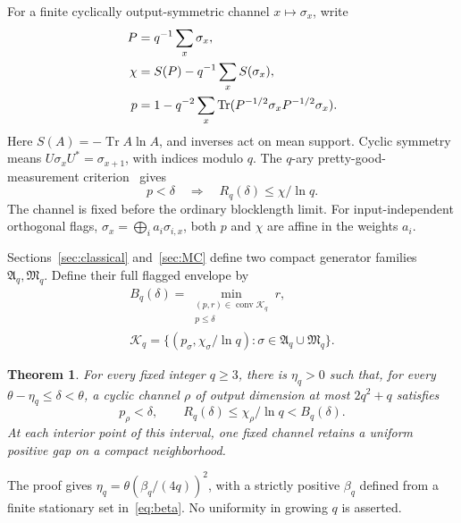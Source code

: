 \documentclass[12pt,letterpaper,onecolumn]{article}
\newtheorem{theorem}{Theorem}
\theoremstyle{definition}
\theoremstyle{remark}
\DeclareMathOperator{\Tr}{Tr}
\DeclareMathOperator{\conv}{conv}
\begin{document}
For a finite cyclically output-symmetric channel \(x\mapsto\sigma_x\), write
\begin{align}
P&=q^{-1}\sum_x\sigma_x,\notag\\
\chi&=S(P)-q^{-1}\sum_xS(\sigma_x),\notag\\
p&=1-q^{-2}\sum_x
\Tr(P^{-1/2}\sigma_xP^{-1/2}\sigma_x).\label{eq:cq}
\end{align}
Here \(S(A)=-\Tr A\ln A\), and inverses act on mean support. Cyclic symmetry means \(U\sigma_xU^*=\sigma_{x+1}\), with indices modulo \(q\). The \(q\)-ary pretty-good-measurement criterion~\cite[Prop.~27]{AG2026} gives
\begin{equation}\label{eq:criterion}
p<\delta\quad\Longrightarrow\quad R_q(\delta)\le\chi/\ln q.
\end{equation}
The channel is fixed before the ordinary blocklength limit. For input-independent orthogonal flags,
\(\sigma_x=\bigoplus_i a_i\sigma_{i,x}\), both \(p\) and \(\chi\) are affine in the weights \(a_i\).

Sections~\ref{sec:classical} and~\ref{sec:MC} define two compact generator families \(\mathfrak A_q,\mathfrak M_q\). Define their full flagged envelope by
\begin{equation}\label{eq:benchmark}
\begin{gathered}
B_q(\delta)=\min_{\substack{(p,r)\in\conv\mathcal K_q\\p\le\delta}}r,
\\
\mathcal K_q=\{(p_\sigma,\chi_\sigma/\ln q):
\sigma\in\mathfrak A_q\cup\mathfrak M_q\}.
\end{gathered}
\end{equation}

\begin{theorem}\label{thm:main}
For every fixed integer \(q\ge3\), there is \(\eta_q>0\) such that, for every
\(\theta-\eta_q\le\delta<\theta\), a cyclic channel \(\rho\) of output dimension at most \(2q^2+q\) satisfies
\begin{equation}\label{eq:strict}
p_\rho<\delta,\qquad
R_q(\delta)\le\chi_\rho/\ln q<B_q(\delta).
\end{equation}
At each interior point of this interval, one fixed channel retains a uniform positive gap on a compact neighborhood.
\end{theorem}

The proof gives \(\eta_q=\theta(\beta_q/(4q))^2\), with a strictly positive \(\beta_q\) defined from a finite stationary set in~\eqref{eq:beta}. No uniformity in growing \(q\) is asserted.
\end{document}
